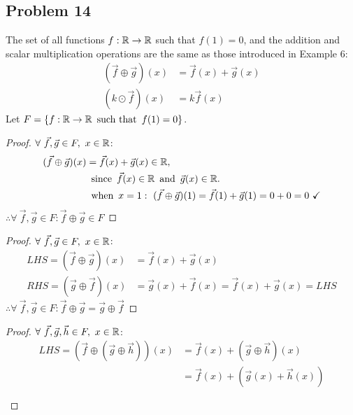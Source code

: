 \subsection*{Problem 14} The set of all functions $f: \mathbb{R} \rightarrow \mathbb{R}$ such that $f(1)=0$,
and the addition and scalar multiplication operations are the same as those introduced in Example 6:
\begin{align*}
  (\vec{f} \oplus \vec{g})(x) & = \vec{f}(x) + \vec{g}(x) \\
  (k \odot \vec{f})(x)        & = k\vec{f}(x)
\end{align*}
Let $F = \{f: \mathbb{R} \rightarrow \mathbb{R} \operatorname{~\text{such that}~} f(1) = 0\}$.
\begin{enumerate}
  \begin{proof}
    $\forall~\vec{f},\vec{g} \in F,~x \in \mathbb{R}$:
    \begin{align*}
      (\vec{f} \oplus \vec{g})(x) & = \vec{f}(x) + \vec{g}(x) \in \mathbb{R},                                                     \\
                                  & \operatorname{~\text{since}~} \vec{f}(x) \in \mathbb{R} \operatorname{~\text{and}~} \vec{g}(x) \in \mathbb{R}.                                \\
                                  & \operatorname{~\text{when}~} x=1:~(\vec{f} \oplus \vec{g})(1) = \vec{f}(1) + \vec{g}(1)  = 0 + 0 = 0~\checkmark
    \end{align*}
    $\therefore \forall~\vec{f},\vec{g} \in F: \vec{f} \oplus \vec{g} \in F$
  \end{proof}
  \begin{proof}
    $\forall~\vec{f},\vec{g} \in F,~x \in \mathbb{R}$:
    \begin{align*}
      LHS = (\vec{f} \oplus \vec{g})(x) & = \vec{f}(x) + \vec{g}(x)                                 \\
      RHS = (\vec{g} \oplus \vec{f})(x) & = \vec{g}(x) + \vec{f}(x) = \vec{f}(x) + \vec{g}(x) = LHS
    \end{align*}
    $\therefore \forall~\vec{f},\vec{g} \in F: \vec{f} \oplus \vec{g} = \vec{g} \oplus \vec{f}$
  \end{proof}
  \begin{proof}
    $\forall~\vec{f},\vec{g},\vec{h} \in F,~x \in \mathbb{R}$:
    \begin{align*}
      LHS = (\vec{f} \oplus (\vec{g} \oplus \vec{h}))(x) & = \vec{f}(x) + (\vec{g} \oplus \vec{h})(x)     \\
                                                         & = \vec{f}(x) + (\vec{g}(x) + \vec{h}(x))       \\ \\

\end{align*}
\end{proof}
\end{enumerate}
